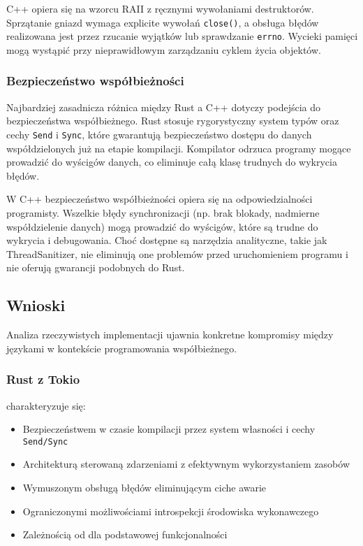 C++ opiera się na wzorcu RAII z ręcznymi wywołaniami destruktorów. Sprzątanie gniazd wymaga explicite wywołań \texttt{close()}, a obsługa błędów realizowana jest przez rzucanie wyjątków lub sprawdzanie \texttt{errno}. Wycieki pamięci mogą wystąpić przy nieprawidłowym zarządzaniu cyklem życia objektów.


\subsubsection{Bezpieczeństwo współbieżności}

Najbardziej zasadnicza różnica między Rust a C++ dotyczy podejścia do bezpieczeństwa współbieżnego. Rust stosuje rygorystyczny system typów oraz cechy \texttt{Send} i \texttt{Sync}, które gwarantują bezpieczeństwo dostępu do danych współdzielonych już na etapie kompilacji. Kompilator odrzuca programy mogące prowadzić do wyścigów danych, co eliminuje całą klasę trudnych do wykrycia błędów.

W C++ bezpieczeństwo współbieżności opiera się na odpowiedzialności programisty. Wszelkie błędy synchronizacji (np. brak blokady, nadmierne współdzielenie danych) mogą prowadzić do wyścigów, które są trudne do wykrycia i debugowania. Choć dostępne są narzędzia analityczne, takie jak ThreadSanitizer, nie eliminują one problemów przed uruchomieniem programu i nie oferują gwarancji podobnych do Rust.



\subsection{Wnioski}

Analiza rzeczywistych implementacji ujawnia konkretne kompromisy między językami w kontekście programowania współbieżnego.

\subsubsection{Rust z Tokio} charakteryzuje się:
\begin{itemize}
    \item Bezpieczeństwem w czasie kompilacji przez system własności i cechy \texttt{Send/Sync}
    \item Architekturą sterowaną zdarzeniami z efektywnym wykorzystaniem zasobów
    \item Wymuszonym obsługą błędów eliminującym ciche awarie 
    \item Ograniczonymi możliwościami introspekcji środowiska wykonawczego
    \item Zależnością od  dla podstawowej funkcjonalności
\end{itemize}


